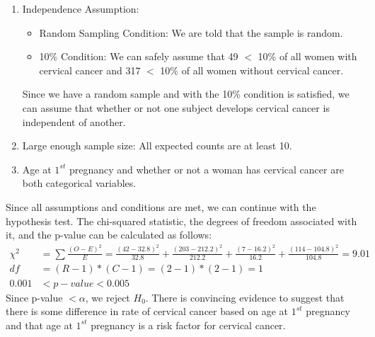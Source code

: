 {{{\begin{enumerate}[1.]
\item Independence Assumption: 
\begin{itemize}
\item Random Sampling Condition: We are told that the sample is random.
\item 10\% Condition: We can safely assume that 49 $<$ 10\% of all women with cervical cancer and 317 $<$ 10\% of all women without cervical cancer.
\end{itemize}
Since we have a random sample and with the 10\% condition is satisfied, we can assume that whether or not one subject develops cervical cancer is independent of another.
\item Large enough sample size: All expected counts are at least 10.
\item Age at $1^{st}$ pregnancy and whether or not a woman has cervical cancer are both categorical variables.
\end{enumerate}
Since all assumptions and conditions are met, we can continue with the hypothesis test. The chi-squared statistic, the degrees of freedom associated with it, and the p-value can be calculated as follows:
\begin{align*}
\chi^2 &= \sum \frac{(O - E)^2}{E} =  \frac{(42 - 32.8)^2} {32.8} + \frac{(203 - 212.2)^2} {212.2} + \frac{(7 - 16.2)^2} {16.2} + \frac{(114 - 104.8)^2} {104.8} = 9.01 \\
df &= (R - 1) * (C - 1) = (2 - 1) * (2 - 1) = 1 \\
0.001 &< p-value < 0.005
\end{align*}
Since p-value $< \alpha$, we reject $H_0$.  There is convincing evidence to suggest that there is some difference in rate of cervical cancer based on age at $1^{st}$ pregnancy and that age at $1^{st}$ pregnancy is a risk factor for cervical cancer.
}
}}

%

